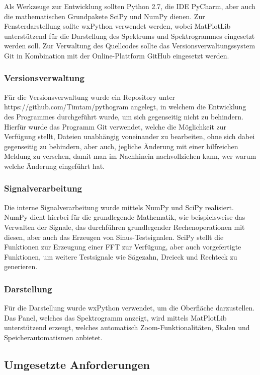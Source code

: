 \documentclass[a4paper]{article}
\begin{document}
Als Werkzeuge zur Entwicklung sollten Python 2.7, die IDE PyCharm, aber auch die mathematischen Grundpakete SciPy und NumPy dienen. Zur Fensterdarstellung sollte wxPython verwendet werden, wobei MatPlotLib unterstützend für die Darstellung des Spektrums und Spektrogrammes eingesetzt werden soll. Zur Verwaltung des Quellcodes sollte das Versionsverwaltungssystem Git in Kombination mit der Online-Plattform GitHub eingesetzt werden.

\subsubsection{Versionsverwaltung}

Für die Versionsverwaltung wurde ein Repository unter https://github.com/Timtam/pythogram angelegt, in welchem die Entwicklung des Programmes durchgeführt wurde, um sich gegenseitig nicht zu behindern. Hierfür wurde das Programm Git verwendet, welche die Möglichkeit zur Verfügung stellt, Dateien unabhängig voneinander zu bearbeiten, ohne sich dabei gegenseitig zu behindern, aber auch, jegliche Änderung mit einer hilfreichen Meldung zu versehen, damit man im Nachhinein nachvollziehen kann, wer warum welche Änderung eingeführt hat.

\subsubsection{Signalverarbeitung}

Die interne Signalverarbeitung wurde mittels NumPy und SciPy realisiert. NumPy dient hierbei für die grundlegende Mathematik, wie beispielsweise das Verwalten der Signale, das durchführen grundlegender Rechenoperationen mit diesen, aber auch das Erzeugen von Sinus-Testsignalen. SciPy stellt die Funktionen zur Erzeugung einer FFT zur Verfügung, aber auch vorgefertigte Funktionen, um weitere Testsignale wie Sägezahn, Dreieck und Rechteck zu generieren.

\subsubsection{Darstellung}

Für die Darstellung wurde wxPython verwendet, um die Oberfläche darzustellen. Das Panel, welches das Spektrogramm anzeigt, wird mittels MatPlotLib unterstützend erzeugt, welches automatisch Zoom-Funktionalitäten, Skalen und Speicherautomatismen anbietet.

\subsection{Umgesetzte Anforderungen}\label{subsec:umgesetzteAnforderungen}
\end{document}

